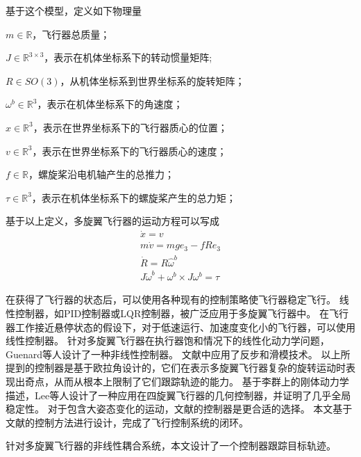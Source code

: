 \documentclass[
  type=master
]{gdutthesis}
\begin{document}
基于这个模型，定义如下物理量

$m \in \mathbb{R}$，飞行器总质量；

$J \in \mathbb{R}^{3 \times 3}$，表示在机体坐标系下的转动惯量矩阵;

$R \in SO(3)$，从机体坐标系到世界坐标系的旋转矩阵；

$\omega^b \in \mathbb{R}^3$，表示在机体坐标系下的角速度；

$x \in \mathbb{R}^3$，表示在世界坐标系下的飞行器质心的位置；

$v \in \mathbb{R}^3$，表示在世界坐标系下的飞行器质心的速度；

$f \in \mathbb{R}$，螺旋桨沿电机轴产生的总推力；

$\tau \in \mathbb{R}^3$，表示在机体坐标系下的螺旋桨产生的总力矩；

基于以上定义，多旋翼飞行器的运动方程可以写成\vspace{1ex}
\begin{gather}\label{eq:dynamics}
		\dot{x} = v\\
		m\dot{v} = mge_3 - fRe_3\\
		\dot{R} = R\hat{\omega}^b\\
		J\dot{\omega}^b + \omega^b \times J \omega^b = \tau
\end{gather}

在获得了飞行器的状态后，可以使用各种现有的控制策略使飞行器稳定飞行。
线性控制器，如PID控制器或LQR控制器，被广泛应用于多旋翼飞行器中\cite{hoffmann2007quadrotor,castillo2004stabilization,nice2004design}。
在飞行器工作接近悬停状态的假设下，对于低速运行、加速度变化小的飞行器，可以使用线性控制器。
针对多旋翼飞行器在执行器饱和情况下的线性化动力学问题，Guenard等人设计了一种非线性控制器\cite{guenard2005dynamic}。
文献\parencite{bouabdallah2005backstepping}中应用了反步和滑模技术。
以上所提到的控制器是基于欧拉角设计的，它们在表示多旋翼飞行器复杂的旋转运动时表现出奇点，从而从根本上限制了它们跟踪轨迹的能力。
基于李群上的刚体动力学描述，Lee等人设计了一种应用在四旋翼飞行器的几何控制器，并证明了几乎全局稳定性\cite{lee2010geometric}。
对于包含大姿态变化的运动，文献\parencite{lee2010geometric}的控制器是更合适的选择。
本文基于文献\parencite{lee2010geometric}的控制方法进行设计，完成了飞行控制系统的闭环。

针对多旋翼飞行器的非线性耦合系统，本文设计了一个控制器跟踪目标轨迹。
\end{document}
